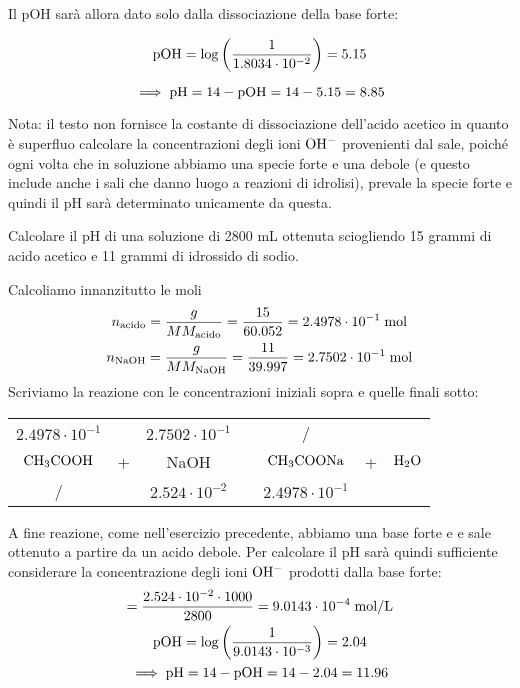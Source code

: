 \begin{soluzione}
Il pOH sarà allora dato solo dalla dissociazione della base forte:

$$\rm pOH=\log{\left(\frac{1}{1.8034 \cdot 10^{-2}}\right)}=5.15$$

$$\implies \rm pH=14-pOH=14-5.15=8.85$$

Nota: il testo non fornisce la costante di dissociazione dell'acido acetico in quanto è superfluo calcolare la concentrazioni degli ioni $\rm OH^-$ provenienti dal sale, poiché ogni volta che in soluzione abbiamo una specie forte e una debole (e questo include anche i sali che danno luogo a reazioni di idrolisi), prevale la specie forte e quindi il pH sarà determinato unicamente da questa.
\end{soluzione}

\newpage

\begin{esercizio}
    Calcolare il pH di una soluzione di 2800 mL ottenuta sciogliendo 15 grammi di acido acetico e 11 grammi di idrossido di sodio.
\end{esercizio}
\begin{soluzione}
    Calcoliamo innanzitutto le moli
    \begin{gather*}
        n_{\text{acido}}=\frac{g}{MM_{\text{acido}}}=\frac{15}{60.052}=2.4978 \cdot 10^{-1} \; \rm mol
        \\
        n_{\text{NaOH}}=\frac{g}{MM_{\text{NaOH}}}=\frac{11}{39.997}=2.7502 \cdot 10^{-1} \; \rm mol
    \end{gather*}
    Scriviamo la reazione con le concentrazioni iniziali sopra e quelle finali sotto:
    \begin{center}
        \begin{tabular}{ccccccc}
            $2.4978 \cdot 10^{-1}$ &  & $2.7502 \cdot 10^{-1}$ & & / &&\\
            $\rm CH_3COOH$ & + & NaOH & \ce{->} & $\rm CH_3COONa$ & + & $\rm H_2O$\\
            / &  &  $2.524 \cdot 10^{-2}$ & & $2.4978 \cdot 10^{-1}$&&\\
        \end{tabular}
    \end{center}
    A fine reazione, come nell'esercizio precedente, abbiamo una base forte e e sale ottenuto a partire da un acido debole. Per calcolare il pH sarà quindi sufficiente considerare la concentrazione degli ioni $\rm OH^-$ prodotti dalla base forte:
    \begin{gather*}
        [\rm OH^-]=\frac{2.524 \cdot 10^{-2} \cdot 1000}{2800}
        =9.0143 \cdot 10^{-4} \; \rm mol/L
        \\
        \rm pOH
        =\log{\left(\frac{1}{9.0143 \cdot 10^{-3}}\right)}
        =2.04
        \\
        \implies \rm pH=14-pOH=14-2.04=11.96
    \end{gather*}
\end{soluzione}

